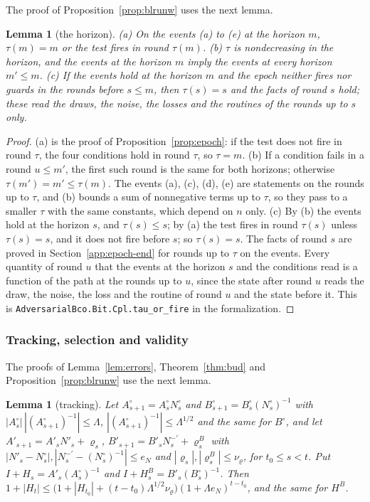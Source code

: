 \documentclass[11pt]{amsart}
\newtheorem{lemma}[theorem]{Lemma}
\theoremstyle{definition}
\numberwithin{equation}{section}
\begin{document}
The proof of Proposition~\ref{prop:blrunw} uses the next lemma.

\begin{lemma}[the horizon]\label{lem:hor}
(a) On the events (a) to (e) at the horizon $m$, $\tau(m)=m$ or the test fires in round $\tau(m)$. (b) $\tau$ is nondecreasing in the horizon, and the events at the horizon $m$ imply the events at every horizon $m'\le m$. (c) If the events hold at the horizon $m$ and the epoch neither fires nor guards in the rounds before $s\le m$, then $\tau(s)=s$ and the facts of round $s$ hold; these read the draws, the noise, the losses and the routines of the rounds up to $s$ only.
\end{lemma}

\begin{proof}
(a) is the proof of Proposition~\ref{prop:epoch}: if the test does not fire in round $\tau$, the four conditions hold in round $\tau$, so $\tau=m$. (b) If a condition fails in a round $u\le m'$, the first such round is the same for both horizons; otherwise $\tau(m')=m'\le\tau(m)$. The events (a), (c), (d), (e) are statements on the rounds up to $\tau$, and (b) bounds a sum of nonnegative terms up to $\tau$, so they pass to a smaller $\tau$ with the same constants, which depend on $n$ only. (c) By (b) the events hold at the horizon $s$, and $\tau(s)\le s$; by (a) the test fires in round $\tau(s)$ unless $\tau(s)=s$, and it does not fire before $s$; so $\tau(s)=s$. The facts of round $s$ are proved in Section~\ref{app:epoch-end} for rounds up to $\tau$ on the events. Every quantity of round $u$ that the events at the horizon $s$ and the conditions read is a function of the path at the rounds up to $u$, since the state after round $u$ reads the draw, the noise, the loss and the routine of round $u$ and the state before it.
This is \texttt{AdversarialBco.Bit.Cpl.tau\_or\_fire} in the formalization.
\end{proof}

\subsubsection{Tracking, selection and validity}\label{app:track-lemmas}

The proofs of Lemma~\ref{lem:errors}, Theorem~\ref{thm:bud} and Proposition~\ref{prop:blrunw} use the next lemma.

\begin{lemma}[tracking]\label{lem:track}
Let $A^\circ_{s+1}=A^\circ_sN^\circ_s$ and $B^\circ_{s+1}=B^\circ_s(N^\circ_s)^{-1}$ with $|A^\circ_s|\,|(A^\circ_{s+1})^{-1}|\le\Lambda$, $|(A^\circ_{s+1})^{-1}|\le\Lambda^{1/2}$ and the same for $B^\circ$, and let $A'_{s+1}=A'_sN'_s+\varrho_s$, $B'_{s+1}=B'_sN^{-\prime}_s+\varrho^B_s$ with $|N'_s-N^\circ_s|,|N^{-\prime}_s-(N^\circ_s)^{-1}|\le e_N$ and $|\varrho_s|,|\varrho^B_s|\le\nu_\varrho$, for $t_0\le s<t$. Put $I+H_s=A'_s(A^\circ_s)^{-1}$ and $I+H^B_s=B'_s(B^\circ_s)^{-1}$. Then $1+|H_t|\le\bigl(1+|H_{t_0}|+(t-t_0)\Lambda^{1/2}\nu_\varrho\bigr)(1+\Lambda e_N)^{t-t_0}$, and the same for $H^B$.
\end{lemma}
\end{document}

